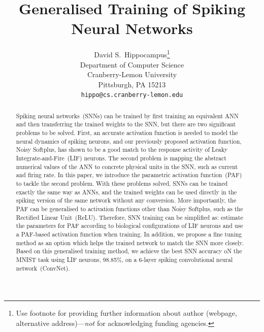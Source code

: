 \documentclass{article}
\title{Generalised Training of Spiking Neural Networks}
\author{
  David S.~Hippocampus\thanks{Use footnote for providing further
    information about author (webpage, alternative
    address)---\emph{not} for acknowledging funding agencies.} \\
  Department of Computer Science\\
  Cranberry-Lemon University\\
  Pittsburgh, PA 15213 \\
  \texttt{hippo@cs.cranberry-lemon.edu} \\
}
\begin{document}

\maketitle

\begin{abstract}
	Spiking neural networks~(SNNs) can be trained by first training an equivalent ANN and then transferring the trained weights to the SNN, but there are two significant problems to be solved.
	First, an accurate activation function is needed to model the neural dynamics of spiking neurons, and our previously proposed activation function, Noisy Softplus, has shown to be a good match to the response activity of Leaky Integrate-and-Fire~(LIF) neurons.
	The second problem is mapping the abstract numerical values of the ANN to concrete physical units in the SNN, such as current and firing rate.
	In this paper, we introduce the parametric activation function~(PAF) to tackle the second problem.
    With these problems solved, SNNs can be trained exactly the same way as ANNs, and the trained weights can be used directly in the spiking version of the same network without any conversion.
    More importantly, the PAF can be generalised to activation functions other than Noisy Softplus, such as the Rectified Linear Unit~(ReLU).%
    Therefore, SNN training can be simplified as: estimate the parameters for PAF according to biological configurations of LIF neurons and use a PAF-based
    activation function when training.
    In addition, we propose a fine tuning method as an option which helps the trained network to match the SNN more closely.
    Based on this generalised training method, we achieve the best SNN accuracy oN the MNIST task using LIF neurons, 98.85\%, on a 6-layer spiking convolutional neural network~(ConvNet).
    


 
\end{abstract}
\end{document}
